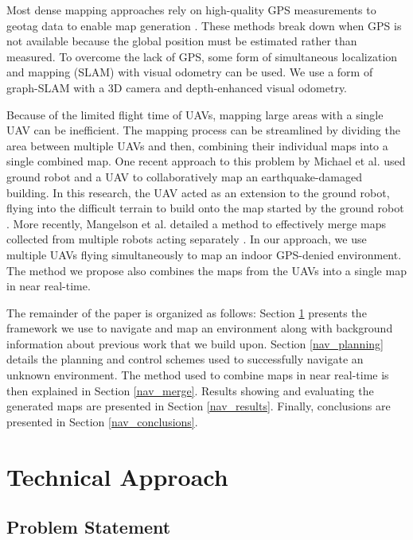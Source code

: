 \documentclass[letterpaper, 10 pt, conference]{ieeeconf}  %
\begin{document}
Most dense mapping approaches rely on high-quality GPS measurements to geotag data to enable map generation \cite{Siebert2014, Martin2015}. These methods break down when GPS is not available because the global position must be estimated rather than measured. To overcome the lack of GPS, some form of simultaneous localization and mapping (SLAM) with visual odometry can be used. We use a form of graph-SLAM with a 3D camera and depth-enhanced visual odometry.

Because of the limited flight time of UAVs, mapping large areas with a single UAV can be inefficient. The mapping process can be streamlined by dividing the area between multiple UAVs and then, combining their individual maps into a single combined map. One recent approach to this problem by Michael et al. used ground robot and a UAV to collaboratively map an earthquake-damaged building. In this research, the UAV acted as an extension to the ground robot, flying into the difficult terrain to build onto the map started by the ground robot \cite{Michael2012}. More recently, Mangelson et al. detailed a method to effectively merge maps collected from multiple robots acting separately \cite{Mangelson2018}. In our approach, we use multiple UAVs flying simultaneously to map an indoor GPS-denied environment. The method we propose also combines the maps from the UAVs into a single map in near real-time.

The remainder of the paper is organized as follows: Section \ref{nav_approach} presents the framework we use to navigate and map an environment along with background information about previous work that we build upon. Section \ref{nav_planning} details the planning and control schemes used to successfully navigate an unknown environment. The method used to combine maps in near real-time is then explained in Section \ref{nav_merge}. Results showing and evaluating the generated maps are presented in Section \ref{nav_results}. Finally, conclusions are presented in Section \ref{nav_conclusions}.

\section{Technical Approach}\label{nav_approach}

\subsection{Problem Statement}
\end{document}
